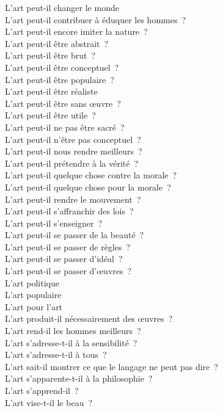 \documentclass[a4paper,12pt]{article}
\begin{document}
L'art peut-il changer le monde \\
L'art peut-il contribuer à éduquer les hommes ? \\
L'art peut-il encore imiter la nature ? \\
L'art peut-il être abstrait ? \\
L'art peut-il être brut ? \\
L'art peut-il être conceptuel ? \\
L'art peut-il être populaire ? \\
L'art peut-il être réaliste \\
L'art peut-il être sans œuvre ? \\
L'art peut-il être utile ? \\
L'art peut-il ne pas être sacré ? \\
L'art peut-il n'être pas conceptuel ? \\
L'art peut-il nous rendre meilleurs ? \\
L'art peut-il prétendre à la vérité ? \\
L'art peut-il quelque chose contre la morale ? \\
L'art peut-il quelque chose pour la morale ? \\
L'art peut-il rendre le mouvement ? \\
L'art peut-il s'affranchir des lois ? \\
L'art peut-il s'enseigner ? \\
L'art peut-il se passer de la beauté ? \\
L'art peut-il se passer de règles ? \\
L'art peut-il se passer d'idéal ? \\
L'art peut-il se passer d'œuvres ? \\
L'art politique \\
L'art populaire \\
L'art pour l'art \\
L'art produit-il nécessairement des œuvres ? \\
L'art rend-il les hommes meilleurs ? \\
L'art s'adresse-t-il à la sensibilité ? \\
L'art s'adresse-t-il à tous ? \\
L'art sait-il montrer ce que le langage ne peut pas dire ? \\
L'art s'apparente-t-il à la philosophie ? \\
L'art s'apprend-il ? \\
L'art vise-t-il le beau ? \\
\end{document}
